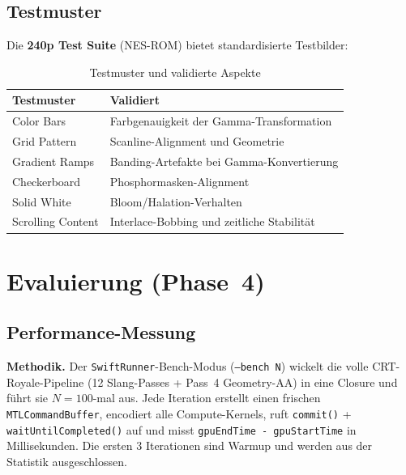 \documentclass[11pt, a4paper]{article}
\newcommand{\tableheadercolor}{\rowcolor{hkared}}
\newcommand{\thw}[1]{\color{white}\textbf{#1}}  %
\begin{document}
\subsection{Testmuster}
\vspace{.5cm}
Die \textbf{240p Test Suite} (NES-ROM) bietet standardisierte Testbilder:
\vspace{.25cm}
\begin{table}[H]
\centering
\small
{}
\begin{tabularx}{\textwidth}{lX}
    \toprule
    \tableheadercolor \thw{Testmuster} & \thw{Validiert} \\
    \midrule
    Color Bars & Farbgenauigkeit der Gamma-Transformation \\
    Grid Pattern & Scanline-Alignment und Geometrie \\
    Gradient Ramps & Banding-Artefakte bei Gamma-Konvertierung \\
    Checkerboard & Phosphormasken-Alignment \\
    Solid White & Bloom/Halation-Verhalten \\
    Scrolling Content & Interlace-Bobbing und zeitliche Stabilit\"at \\
    \bottomrule
\end{tabularx}
 \vspace{.25cm}
\caption{Testmuster und validierte Aspekte}
\end{table}
\newpage \vspace*{-1.25cm}
\section{Evaluierung (Phase~4)}
\vspace{.125cm}

\subsection{Performance-Messung}
\vspace{.25cm}

\textbf{Methodik.} Der \texttt{SwiftRunner}-Bench-Modus (\texttt{--bench N}) wickelt die volle CRT-Royale-Pipeline (12 Slang-Passes + Pass~4 Geometry-AA) in eine Closure und f\"uhrt sie $N = 100$-mal aus. Jede Iteration erstellt einen frischen \texttt{MTLCommandBuffer}, encodiert alle Compute-Kernels, ruft \texttt{commit()} + \texttt{waitUntilCompleted()} auf und misst \texttt{gpuEndTime - gpuStartTime} in Millisekunden. Die ersten 3 Iterationen sind Warmup und werden aus der Statistik ausgeschlossen.
\end{document}
